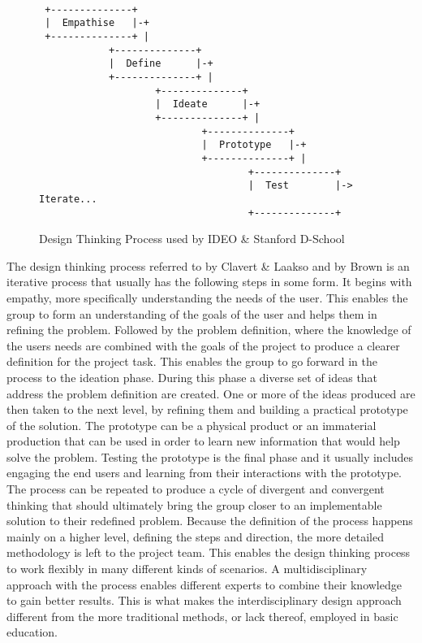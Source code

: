 \documentclass[english,12pt,a4paper,pdftex]{article}
\begin{document}

\begin{figure}[H]
\begin{verbatim}
 
 +--------------+
 |  Empathise   |-+
 +--------------+ |
            +--------------+
            |  Define      |-+
            +--------------+ |
                    +--------------+
                    |  Ideate      |-+
                    +--------------+ |
                            +--------------+
                            |  Prototype   |-+
                            +--------------+ |
                                    +--------------+
                                    |  Test        |-> Iterate...
                                    +--------------+
\end{verbatim}
\caption{Design Thinking Process used by IDEO \& Stanford D-School}
\label{fig:dt-process}
\end{figure}

The design thinking process referred to by Clavert \& Laakso \cite{Clavert} and by Brown \cite{Brown} is an iterative process that usually has the following steps in some form. It begins with empathy, more specifically understanding the needs of the user. This enables the group to form an understanding of the goals of the user and helps them in refining the problem. Followed by the problem definition, where the knowledge of the users needs are combined with the goals of the project to produce a clearer definition for the project task. This enables the group to go forward in the process to the ideation phase. During this phase a diverse set of ideas that address the problem definition are created. One or more of the ideas produced are then taken to the next level, by refining them and building a practical prototype of the solution. The prototype can be a physical product or an immaterial production that can be used in order to learn new information that would help solve the problem. Testing the prototype is the final phase and it usually includes engaging the end users and learning from their interactions with the prototype. \cite{Clavert,Brown} The process can be repeated to produce a cycle of divergent and convergent thinking that should ultimately bring the group closer to an implementable solution to their redefined problem. Because the definition of the process happens mainly on a higher level, defining the steps and direction, the more detailed methodology is left to the project team. This enables the design thinking process to work flexibly in many different kinds of scenarios. A multidisciplinary approach with the process enables different experts to combine their knowledge to gain better results. This is what makes the interdisciplinary design approach different from the more traditional methods, or lack thereof, employed in basic education.
\end{document}
